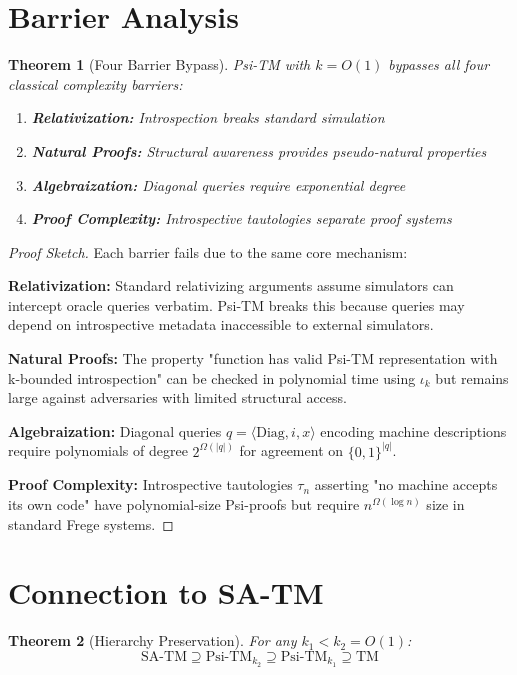 \documentclass[11pt]{article}
\newtheorem{theorem}{Theorem}
\begin{document}
\section{Barrier Analysis}

\begin{theorem}[Four Barrier Bypass]
Psi-TM with $k = O(1)$ bypasses all four classical complexity barriers:
\begin{enumerate}
\item \textbf{Relativization:} Introspection breaks standard simulation
\item \textbf{Natural Proofs:} Structural awareness provides pseudo-natural properties
\item \textbf{Algebraization:} Diagonal queries require exponential degree
\item \textbf{Proof Complexity:} Introspective tautologies separate proof systems
\end{enumerate}
\end{theorem}

\begin{proof}[Proof Sketch]
Each barrier fails due to the same core mechanism:

\textbf{Relativization:} Standard relativizing arguments assume simulators can intercept oracle queries verbatim. Psi-TM breaks this because queries may depend on introspective metadata inaccessible to external simulators.

\textbf{Natural Proofs:} The property "function has valid Psi-TM representation with k-bounded introspection" can be checked in polynomial time using $\iota_k$ but remains large against adversaries with limited structural access.

\textbf{Algebraization:} Diagonal queries $q = \langle \text{Diag}, i, x \rangle$ encoding machine descriptions require polynomials of degree $2^{\Omega(|q|)}$ for agreement on $\{0,1\}^{|q|}$.

\textbf{Proof Complexity:} Introspective tautologies $\tau_n$ asserting "no machine accepts its own code" have polynomial-size Psi-proofs but require $n^{\Omega(\log n)}$ size in standard Frege systems.
\end{proof}

\section{Connection to SA-TM}

\begin{theorem}[Hierarchy Preservation]
For any $k_1 < k_2 = O(1)$:
$$\text{SA-TM} \supseteq \text{Psi-TM}_{k_2} \supseteq \text{Psi-TM}_{k_1} \supseteq \text{TM}$$
\end{theorem}
\end{document}
